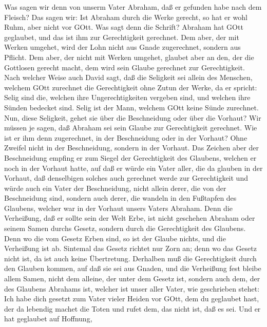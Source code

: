  Was sagen wir denn von unserm Vater Abraham, daß er
gefunden habe nach dem Fleisch?  Das sagen wir: Ist Abraham
durch die Werke gerecht, so hat er wohl Ruhm, aber nicht vor GOtt.
 Was sagt denn die Schrift? Abraham hat GOtt geglaubet, und
das ist ihm zur Gerechtigkeit gerechnet.  Dem aber, der mit
Werken umgehet, wird der Lohn nicht aus Gnade zugerechnet, sondern aus
Pflicht.  Dem aber, der nicht mit Werken umgehet, glaubet
aber an den, der die Gottlosen gerecht macht, dem wird sein Glaube
gerechnet zur Gerechtigkeit.  Nach welcher Weise auch David
sagt, daß die Seligkeit sei allein des Menschen, welchem GOtt zurechnet
die Gerechtigkeit ohne Zutun der Werke, da er spricht: 
Selig sind die, welchen ihre Ungerechtigkeiten vergeben sind, und
welchen ihre Sünden bedecket sind.  Selig ist der Mann,
welchem GOtt keine Sünde zurechnet.  Nun, diese Seligkeit,
gehet sie über die Beschneidung oder über die Vorhaut? Wir müssen je
sagen, daß Abraham sei sein Glaube zur Gerechtigkeit gerechnet.
 Wie ist er ihm denn zugerechnet, in der Beschneidung oder
in der Vorhaut? Ohne Zweifel nicht in der Beschneidung, sondern in der
Vorhaut.  Das Zeichen aber der Beschneidung empfing er zum
Siegel der Gerechtigkeit des Glaubens, welchen er noch in der Vorhaut
hatte, auf daß er würde ein Vater aller, die da glauben in der Vorhaut,
daß denselbigen solches auch gerechnet werde zur Gerechtigkeit
 und würde auch ein Vater der Beschneidung, nicht allein
derer, die von der Beschneidung sind, sondern auch derer, die wandeln in
den Fußtapfen des Glaubens, welcher war in der Vorhaut unsers Vaters
Abraham.  Denn die Verheißung, daß er sollte sein der Welt
Erbe, ist nicht geschehen Abraham oder seinem Samen durchs Gesetz,
sondern durch die Gerechtigkeit des Glaubens.  Denn wo die
vom Gesetz Erben sind, so ist der Glaube nichts, und die Verheißung ist
ab.  Sintemal das Gesetz richtet nur Zorn an; denn wo das
Gesetz nicht ist, da ist auch keine Übertretung.  Derhalben
muß die Gerechtigkeit durch den Glauben kommen, auf daß sie sei aus
Gnaden, und die Verheißung fest bleibe allem Samen, nicht dem alleine,
der unter dem Gesetz ist, sondern auch dem, der des Glaubens Abrahams
ist, welcher ist unser aller Vater,  wie geschrieben
stehet: Ich habe dich gesetzt zum Vater vieler Heiden vor GOtt, dem du
geglaubet hast, der da lebendig machet die Toten und rufet dem, das
nicht ist, daß es sei.  Und er hat geglaubet auf Hoffnung,
